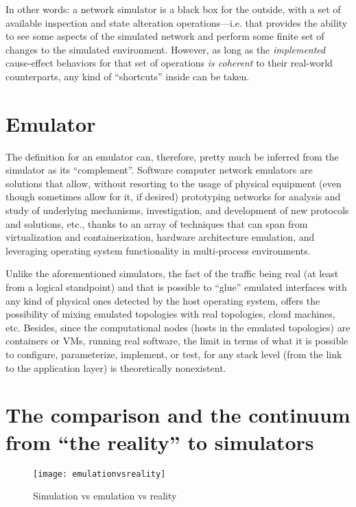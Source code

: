In other words: a network simulator is a black box for the outside, with a set of available inspection and state alteration operations---i.e. that provides the ability to see some aspects of the simulated network and perform some finite set of changes to the simulated environment.
However, as long as the \emph{implemented} cause-effect behaviors for that set of operations \emph{is coherent} to their real-world counterparts, any kind of ``shortcuts'' inside can be taken.

\section{Emulator}
\label{sec:emulator}

The definition for an emulator can, therefore, pretty much be inferred from the simulator as its ``complement''.
Software computer network emulators are solutions that allow, without resorting to the usage of physical equipment (even though sometimes allow for it, if desired) prototyping networks for analysis and study of underlying mechanisms, investigation, and development of new protocols and solutions, etc., thanks to an array of techniques that can span from virtualization and containerization, hardware architecture emulation, and leveraging operating system functionality in multi-process environments.

Unlike the aforementioned simulators, the fact of the traffic being real (at least from a logical standpoint) and that is possible to ``glue'' emulated interfaces with any kind of physical ones detected by the host operating system, offers the possibility of mixing emulated topologies with real topologies, cloud machines, etc.
Besides, since the computational nodes (hosts in the emulated topologies) are containers or VMs, running real software, the limit in terms of what it is possible to configure, parameterize, implement, or test, for any stack level (from the link to the application layer) is theoretically nonexistent.

\section{The comparison and the continuum from ``the reality'' to simulators}
\label{sec:emulationversussimulation}

\begin{figure}
  \centering
  \texttt{[image: emulationvsreality]}
  \caption{Simulation vs emulation vs reality}
  \label{fig:emulationvsreality}
\end{figure}

